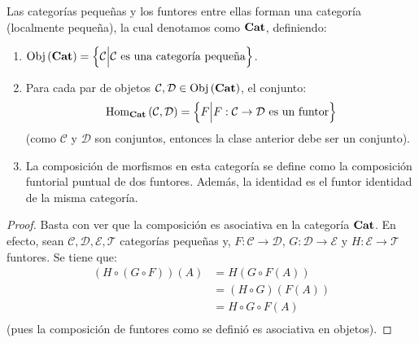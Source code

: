 \documentclass[12pt]{report}
\theoremstyle{largebreak}
\newcommand\cf[3]{\ensuremath{#1:#2\rightarrow#3}}
\newcommand{\Obj}[1]{\ensuremath{\textup{Obj}\left(#1\right)}}
\newcommand{\Hom}[3]{\ensuremath{\textup{Hom}_{#1}\left(#2,#3\right)}}
\newcommand{\Cat}[1]{\ensuremath{\textup{\textbf{#1}}}}
\begin{document}
    \begin{propo}
        Las categorías pequeñas y los funtores entre ellas forman una categoría (localmente pequeña), la cual denotamos como $\Cat{Cat}$, definiendo:
        \begin{enumerate}
            \item $\Obj{\Cat{Cat}}=\left\{\mathcal{C}\Big|\mathcal{C}\textup{ es una categoría pequeña} \right\}$.
            \item Para cada par de objetos $\mathcal{C},\mathcal{D}\in\Obj{\Cat{Cat}}$, el conjunto:
            \begin{equation*}
                \Hom{\Cat{Cat}}{\mathcal{C}}{\mathcal{D}}=\left\{F\Big|\cf{F}{\mathcal{C}}{\mathcal{D}}\textup{ es un funtor} \right\}
            \end{equation*}
            (como $\mathcal{C}$ y $\mathcal{D}$ son conjuntos, entonces la clase anterior debe ser un conjunto).
            \item La composición de morfismos en esta categoría se define como la composición funtorial puntual de dos funtores. Además, la identidad es el funtor identidad de la misma categoría.
        \end{enumerate}
    \end{propo}

    \begin{proof}
        Basta con ver que la composición es asociativa en la categoría $\Cat{Cat}$. En efecto, sean $\mathcal{C},\mathcal{D},\mathcal{E},\mathcal{T}$ categorías pequeñas y, $\cf{F}{\mathcal{C}}{\mathcal{D}}$, $\cf{G}{\mathcal{D}}{\mathcal{E}}$ y $\cf{H}{\mathcal{E}}{\mathcal{T}}$ funtores. Se tiene que:
        \begin{equation*}
            \begin{split}
                (H\circ (G\circ F))(A)&=H(G\circ F(A))\\
                &=(H\circ G) (F(A))\\
                &=H\circ G\circ F(A)\\
            \end{split}
        \end{equation*}
        (pues la composición de funtores como se definió es asociativa en objetos).
    \end{proof}
\end{document}

